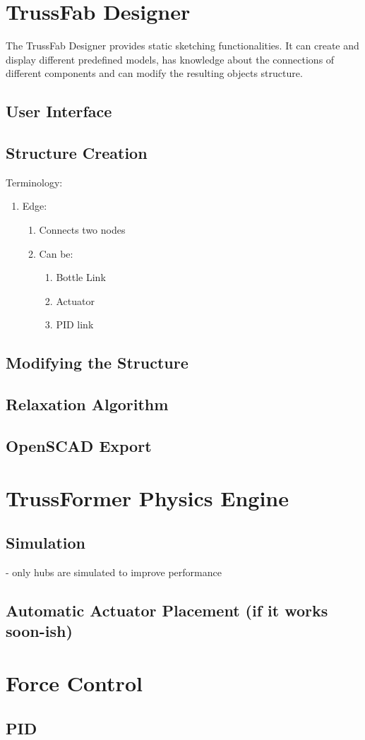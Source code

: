 \section{TrussFab Designer}
The TrussFab Designer provides static sketching functionalities. It can create and display different predefined models, has knowledge about the connections of different components and can modify the resulting objects structure.

\subsection{User Interface}

\subsection{Structure Creation}
Terminology:\\
\begin{enumerate}
    \item Edge:
    \begin{enumerate}
        \item Connects two nodes
        \item Can be:
        \begin{enumerate}
            \item Bottle Link
            \item Actuator
            \item PID link
        \end{enumerate}
    \end{enumerate}
\end{enumerate}

\subsection{Modifying the Structure}

\subsection{Relaxation Algorithm}\label{sec:relaxation}

\subsection{OpenSCAD Export}\label{sec:openscad_impl}

\section{TrussFormer Physics Engine}

\subsection{Simulation}\label{sec:simulation}
- only hubs are simulated to improve performance

\subsection{Automatic Actuator Placement (if it works soon-ish)}

\section{Force Control}

\subsection{PID}
